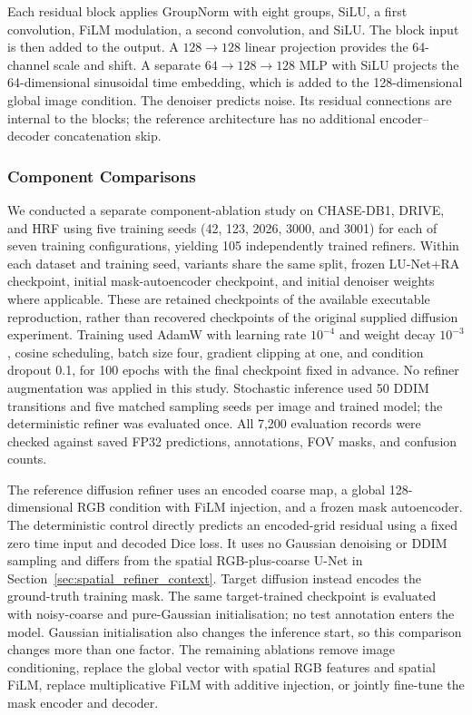 \documentclass[jimaging,article,submit,pdftex,moreauthors]{Definitions/mdpi}%
\begin{document}
Each residual block applies GroupNorm with eight groups, SiLU, a first convolution, FiLM modulation, a second convolution, and SiLU. The block input is then added to the output. A $128\rightarrow128$ linear projection provides the 64-channel scale and shift. A separate $64\rightarrow128\rightarrow128$ MLP with SiLU projects the 64-dimensional sinusoidal time embedding, which is added to the 128-dimensional global image condition. The denoiser predicts noise. Its residual connections are internal to the blocks; the reference architecture has no additional encoder--decoder concatenation skip.

\subsubsection{Component Comparisons}


We conducted a separate component-ablation study on CHASE-DB1, DRIVE, and HRF using five training seeds (42, 123, 2026, 3000, and 3001) for each of seven training configurations, yielding 105 independently trained refiners. Within each dataset and training seed, variants share the same split, frozen LU-Net+RA checkpoint, initial mask-autoencoder checkpoint, and initial denoiser weights where applicable. These are retained checkpoints of the available executable reproduction, rather than recovered checkpoints of the original supplied diffusion experiment. Training used AdamW with learning rate $10^{-4}$ and weight decay $10^{-3}$, cosine scheduling, batch size four, gradient clipping at one, and condition dropout 0.1, for 100 epochs with the final checkpoint fixed in advance. No refiner augmentation was applied in this study. Stochastic inference used 50 DDIM transitions and five matched sampling seeds per image and trained model; the deterministic refiner was evaluated once. All 7,200 evaluation records were checked against saved FP32 predictions, annotations, FOV masks, and confusion counts.

The reference diffusion refiner uses an encoded coarse map, a global 128-dimensional RGB condition with FiLM injection, and a frozen mask autoencoder. The deterministic control directly predicts an encoded-grid residual using a fixed zero time input and decoded Dice loss. It uses no Gaussian denoising or DDIM sampling and differs from the spatial RGB-plus-coarse U-Net in Section~\ref{sec:spatial_refiner_context}. Target diffusion instead encodes the ground-truth training mask. The same target-trained checkpoint is evaluated with noisy-coarse and pure-Gaussian initialisation; no test annotation enters the model. Gaussian initialisation also changes the inference start, so this comparison changes more than one factor. The remaining ablations remove image conditioning, replace the global vector with spatial RGB features and spatial FiLM, replace multiplicative FiLM with additive injection, or jointly fine-tune the mask encoder and decoder.
\end{document}
